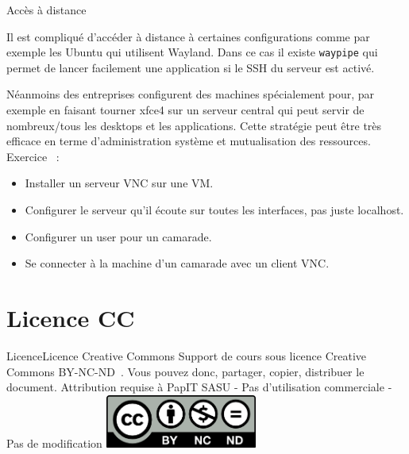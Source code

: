 \documentclass{beamer}
\begin{document}
    \begin{frame}{Accès à distance}
        \begin{dangercolorbox}
            Il est compliqué d'accéder à distance à certaines configurations comme par exemple les Ubuntu qui utilisent Wayland.
            \bigbreak
            Dans ce cas il existe \lstinline{waypipe} qui permet de lancer facilement une application si le SSH du serveur est activé.
        \end{dangercolorbox}
        Néanmoins des entreprises configurent des machines spécialement pour, par exemple en faisant tourner xfce4 sur un serveur central qui peut servir de nombreux/tous les desktops et les applications.
        Cette stratégie peut être très efficace en terme d'administration système et mutualisation des ressources.
        \bigbreak
        Exercice \execcounterdispinc~:
        \begin{itemize}
            \item Installer un serveur VNC sur une VM.
            \item Configurer le serveur qu'il écoute sur toutes les interfaces, pas juste localhost.
            \item Configurer un user pour un camarade.
            \item Se connecter à la machine d'un camarade avec un client VNC.
        \end{itemize}
    \end{frame}


    \section{Licence CC}\label{sec:licence}

    \begin{frame}{Licence}{Licence Creative Commons}
        Support de cours sous licence Creative Commons BY-NC-ND~.
        \bigbreak
        Vous pouvez donc, partager, copier, distribuer le document.
        \bigbreak
        Attribution requise à PapIT SASU - Pas d’utilisation commerciale - Pas de modification
        \bigbreak
        \centering
        \includegraphics[width=5cm]{image/by-nc-nd-logo}
    \end{frame}
\end{document}
